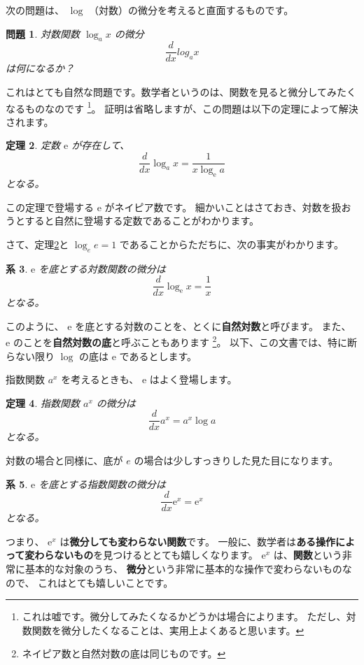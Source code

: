 \documentclass[uplatex,dvipdfmx]{jsarticle}
\newtheorem{thm}{定理}
\newtheorem{prob}[thm]{問題}
\newtheorem{lem}[thm]{系}
\begin{document}
  次の問題は、 $\log$ （対数）の微分を考えると直面するものです。
  \begin{prob}
    対数関数 $\log_{a}x$ の微分
    \[
      \frac{d}{dx} log_{a}x
    \]
    は何になるか？
  \end{prob}
  これはとても自然な問題です。数学者というのは、関数を見ると微分してみたくなるものなのです
  \footnote{
    これは嘘です。微分してみたくなるかどうかは場合によります。
    ただし、対数関数を微分したくなることは、実用上よくあると思います。
  }。
  証明は省略しますが、この問題は以下の定理によって解決されます。
  \begin{thm}\label{differentiate_log}
    定数 $\mathrm{e}$ が存在して、
    \[
      \frac{d}{dx}\log_{a}x = \frac{1}{x\log_{\mathrm{e}}a}
    \]
    となる。
  \end{thm}
  この定理で登場する $\mathrm{e}$ がネイピア数です。
  細かいことはさておき、対数を扱おうとすると自然に登場する定数であることがわかります。

  さて、定理\ref{differentiate_log}と $\log_{e}{e} = 1$ であることからただちに、次の事実がわかります。
  \begin{lem}
    $\mathrm{e}$ を底とする対数関数の微分は
    \[
      \frac{d}{dx}\log_{\mathrm{e}}x = \frac{1}{x}
    \]
    となる。
  \end{lem}
  このように、 $\mathrm{e}$ を底とする対数のことを、とくに\textbf{自然対数}と呼びます。
  また、 $\mathrm{e}$ のことを\textbf{自然対数の底}と呼ぶこともあります
  \footnote{ネイピア数と自然対数の底は同じものです。}。
  以下、この文書では、特に断らない限り $\log$ の底は $\mathrm{e}$ であるとします。

  指数関数 $a^x$ を考えるときも、 $\mathrm{e}$ はよく登場します。
  \begin{thm}
    指数関数 $a^x$ の微分は
    \[
      \frac{d}{dx}a^x = a^x \log a
    \]
    となる。
  \end{thm}
  対数の場合と同様に、底が $e$ の場合は少しすっきりした見た目になります。
  \begin{lem}
    $\mathrm{e}$ を底とする指数関数の微分は
    \[
      \frac{d}{dx}\mathrm{e}^x = \mathrm{e}^x
    \]
    となる。
  \end{lem}
  つまり、 $\mathrm{e}^x$ は\textbf{微分しても変わらない関数}です。
  一般に、数学者は\textbf{ある操作によって変わらないもの}を見つけるととても嬉しくなります。
  $\mathrm{e}^x$ は、\textbf{関数}という非常に基本的な対象のうち、
  \textbf{微分}という非常に基本的な操作で変わらないものなので、
  これはとても嬉しいことです。
\end{document}

